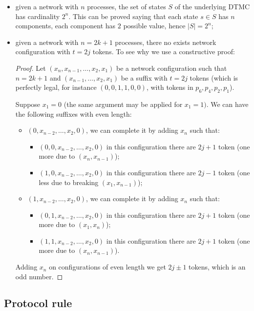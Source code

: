 \begin{itemize}
\item given a network with $n$ processes, the set of states $S$ of the
  underlying DTMC has cardinality $2^n$. This can be proved saying
  that each state $s\in S$ has $n$ components, each component has $2$
  possible value, hence $|S| = 2^n$;
\item given a network with $n = 2k+1$ processes, there no exists
  network configuration with $t=2j$ tokens. To see why we use a
  constructive proof:
  \begin{proof} Let $(x_n,x_{n-1}, \ldots, x_2,x_1)$ be a network
    configuration such that $n=2k+1$ and $(x_{n-1}, \ldots,x_2, x_1)$
    be a suffix with $t=2j$ tokens (which is perfectly legal, for
    instance $(0,0,1,1,0,0)$, with tokens in $p_6, p_4, p_2, p_1$).

    Suppose $x_1 = 0$ (the same argument may be applied for
    $x_1=1)$. We can have the following suffixes with even length:
    \begin{itemize}
    \item $(0,x_{n-2},\ldots, x_2,0)$, we can complete it by adding
      $x_n$ such that:
      \begin{itemize}
      \item $(0,0,x_{n-2},\ldots, x_2, 0)$ in this configuration there
        are $2j+1$ token (one more due to $(x_n,x_{n-1})$);
      \item $(1,0,x_{n-2},\ldots, x_2,0)$ in this configuration there
        are $2j-1$ token (one less due to breaking $(x_1,x_{n-1})$);
      \end{itemize}
    \item $(1,x_{n-2},\ldots, x_2,0)$, we can complete it by adding
      $x_n$ such that:
      \begin{itemize}
      \item $(0,1,x_{n-2},\ldots, x_2, 0)$ in this configuration there
        are $2j+1$ token (one more due to $(x_1,x_n)$);
      \item $(1,1,x_{n-2},\ldots, x_2,0)$ in this configuration there
        are $2j+1$ token (one more due to $(x_n,x_{n-1})$).
      \end{itemize}
    \end{itemize}
    Adding $x_n$ on configurations of even length we get $2j\pm 1 $
    tokens, which is an odd number.
  \end{proof}
\end{itemize}

\subsection{Protocol rule}

